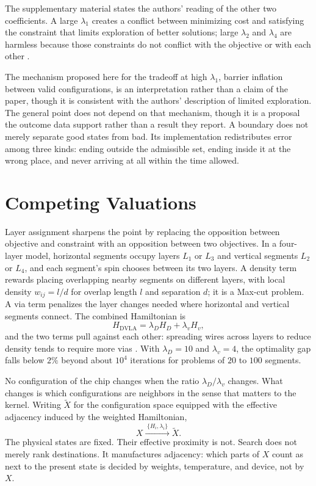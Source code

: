 \documentclass[11pt]{article}
\theoremstyle{definition}
\theoremstyle{remark}
\begin{document}
The supplementary material states the authors' reading of the other two coefficients. A large $\lambda_1$ creates a conflict between minimizing cost and satisfying the constraint that limits exploration of better solutions; large $\lambda_2$ and $\lambda_4$ are harmless because those constraints do not conflict with the objective or with each other \cite{li2026}.

The mechanism proposed here for the tradeoff at high $\lambda_1$, barrier inflation between valid configurations, is an interpretation rather than a claim of the paper, though it is consistent with the authors' description of limited exploration. The general point does not depend on that mechanism, though it is a proposal the outcome data support rather than a result they report. A boundary does not merely separate good states from bad. Its implementation redistributes error among three kinds: ending outside the admissible set, ending inside it at the wrong place, and never arriving at all within the time allowed.

\section{Competing Valuations}

Layer assignment sharpens the point by replacing the opposition between objective and constraint with an opposition between two objectives. In a four-layer model, horizontal segments occupy layers $L_1$ or $L_3$ and vertical segments $L_2$ or $L_4$, and each segment's spin chooses between its two layers. A density term rewards placing overlapping nearby segments on different layers, with local density $w_{ij} = l/d$ for overlap length $l$ and separation $d$; it is a Max-cut problem. A via term penalizes the layer changes needed where horizontal and vertical segments connect. The combined Hamiltonian is
\begin{equation}
H_{\mathrm{DVLA}} = \lambda_D H_D + \lambda_v H_v ,
\end{equation}
and the two terms pull against each other: spreading wires across layers to reduce density tends to require more vias \cite{li2026}. With $\lambda_D = 10$ and $\lambda_v = 4$, the optimality gap falls below $2\%$ beyond about $10^4$ iterations for problems of $20$ to $100$ segments.

No configuration of the chip changes when the ratio $\lambda_D / \lambda_v$ changes. What changes is which configurations are neighbors in the sense that matters to the kernel. Writing $\widetilde{X}$ for the configuration space equipped with the effective adjacency induced by the weighted Hamiltonian,
\begin{equation}
X \xrightarrow{\;\{H_i, \lambda_i\}\;} \widetilde{X}.
\end{equation}
The physical states are fixed. Their effective proximity is not.
Search does not merely rank destinations. It manufactures adjacency: which parts of $X$ count as next to the present state is decided by weights, temperature, and device, not by $X$.
\end{document}
